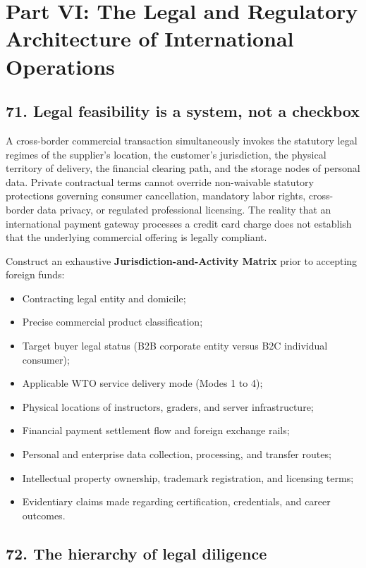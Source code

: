\section{Part VI: The Legal and Regulatory Architecture of International Operations}

\subsection{71. Legal feasibility is a system, not a checkbox}

A cross-border commercial transaction simultaneously invokes the statutory legal regimes of the supplier's location, the customer's jurisdiction, the physical territory of delivery, the financial clearing path, and the storage nodes of personal data. Private contractual terms cannot override non-waivable statutory protections governing consumer cancellation, mandatory labor rights, cross-border data privacy, or regulated professional licensing. The reality that an international payment gateway processes a credit card charge does not establish that the underlying commercial offering is legally compliant.

Construct an exhaustive \textbf{Jurisdiction-and-Activity Matrix} prior to accepting foreign funds:
\begin{itemize}
    \item Contracting legal entity and domicile;
    \item Precise commercial product classification;
    \item Target buyer legal status (B2B corporate entity versus B2C individual consumer);
    \item Applicable WTO service delivery mode (Modes 1 to 4);
    \item Physical locations of instructors, graders, and server infrastructure;
    \item Financial payment settlement flow and foreign exchange rails;
    \item Personal and enterprise data collection, processing, and transfer routes;
    \item Intellectual property ownership, trademark registration, and licensing terms;
    \item Evidentiary claims made regarding certification, credentials, and career outcomes.
\end{itemize}

\subsection{72. The hierarchy of legal diligence}

